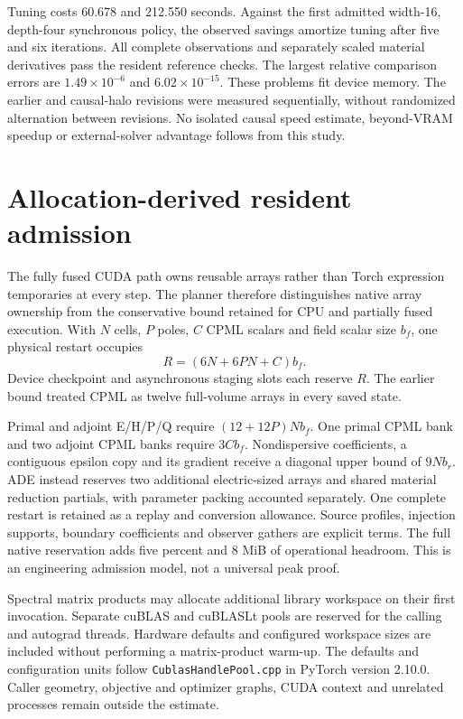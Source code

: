 \documentclass[11pt,a4paper]{article}
\begin{document}
Tuning costs 60.678 and 212.550 seconds. Against the first admitted
width-16, depth-four synchronous policy, the observed savings amortize
tuning after five and six iterations. All complete observations and
separately scaled material derivatives pass the resident reference checks.
The largest relative comparison errors are $1.49\times10^{-6}$ and
$6.02\times10^{-15}$. These problems fit device memory. The earlier and
causal-halo revisions were measured sequentially, without randomized
alternation between revisions. No isolated causal speed estimate,
beyond-VRAM speedup or external-solver advantage follows from this study.


\section{Allocation-derived resident admission}
The fully fused CUDA path owns reusable arrays rather than Torch expression
temporaries at every step. The planner therefore distinguishes native array
ownership from the conservative bound retained for CPU and partially fused
execution. With $N$ cells, $P$ poles, $C$ CPML scalars and field scalar size
$b_f$, one physical restart occupies
\begin{equation}
 R=(6N+6PN+C)b_f.
\end{equation}
Device checkpoint and asynchronous staging slots each reserve $R$. The earlier
bound treated CPML as twelve full-volume arrays in every saved state.

Primal and adjoint E/H/P/Q require $(12+12P)Nb_f$. One primal CPML bank and two
adjoint CPML banks require $3Cb_f$. Nondispersive coefficients, a contiguous
epsilon copy and its gradient receive a diagonal upper bound of $9Nb_r$.
ADE instead reserves two additional electric-sized arrays and shared material
reduction partials, with parameter packing accounted separately. One complete
restart is retained as a replay and conversion allowance. Source profiles,
injection supports, boundary coefficients and observer gathers are explicit
terms. The full native reservation adds five percent and 8 MiB of operational
headroom. This is an engineering admission model, not a universal peak proof.

Spectral matrix products may allocate additional library workspace on their
first invocation. Separate cuBLAS and cuBLASLt pools are reserved for the
calling and autograd threads. Hardware defaults and configured workspace
sizes are included without performing a matrix-product warm-up.
The defaults and configuration units follow \texttt{CublasHandlePool.cpp}
in PyTorch version 2.10.0. Caller geometry, objective and optimizer graphs,
CUDA context and unrelated processes remain outside the estimate.
\end{document}
